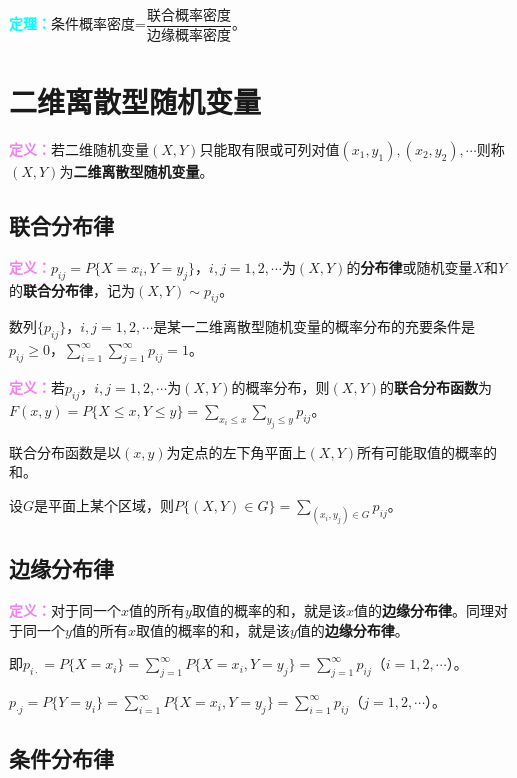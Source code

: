 \documentclass[UTF8, 12pt]{ctexart}
\begin{document}
\textcolor{aqua}{\textbf{定理：}}条件概率密度=$\dfrac{\text{联合概率密度}}{\text{边缘概率密度}}$。

\section{二维离散型随机变量}

\textcolor{violet}{\textbf{定义：}}若二维随机变量$(X,Y)$只能取有限或可列对值$(x_1,y_1),(x_2,y_2),\cdots$则称$(X,Y)$为\textbf{二维离散型随机变量}。

\subsection{联合分布律}

\textcolor{violet}{\textbf{定义：}}$p_{ij}=P\{X=x_i,Y=y_j\}$，$i,j=1,2,\cdots$为$(X,Y)$的\textbf{分布律}或随机变量$X$和$Y$的\textbf{联合分布律}，记为$(X,Y)\sim p_{ij}$。

数列$\{p_{ij}\}$，$i,j=1,2,\cdots$是某一二维离散型随机变量的概率分布的充要条件是$p_{ij}\geqslant0$，$\sum\limits_{i=1}^\infty\sum\limits_{j=1}^\infty p_{ij}=1$。

\textcolor{violet}{\textbf{定义：}}若$p_{ij}$，$i,j=1,2,\cdots$为$(X,Y)$的概率分布，则$(X,Y)$的\textbf{联合分布函数}为$F(x,y)=P\{X\leqslant x,Y\leqslant y\}=\sum\limits_{x_i\leqslant x}\sum\limits_{y_j\leqslant y}p_{ij}$。

联合分布函数是以$(x,y)$为定点的左下角平面上$(X,Y)$所有可能取值的概率的和。

设$G$是平面上某个区域，则$P\{(X,Y)\in G\}=\sum\limits_{(x_i,y_j)\in G}p_{ij}$。

\subsection{边缘分布律}

\textcolor{violet}{\textbf{定义：}}对于同一个$x$值的所有$y$取值的概率的和，就是该$x$值的\textbf{边缘分布律}。同理对于同一个$y$值的所有$x$取值的概率的和，就是该$y$值的\textbf{边缘分布律}。

即$p_{i\cdot}=P\{X=x_i\}=\sum\limits_{j=1}^\infty P\{X=x_i,Y=y_j\}=\sum\limits_{j=1}^\infty p_{ij}$（$i=1,2,\cdots$）。

$p_{\cdot j}=P\{Y=y_i\}=\sum\limits_{i=1}^\infty P\{X=x_i,Y=y_j\}=\sum\limits_{i=1}^\infty p_{ij}$（$j=1,2,\cdots$）。

\subsection{条件分布律}
\end{document}
